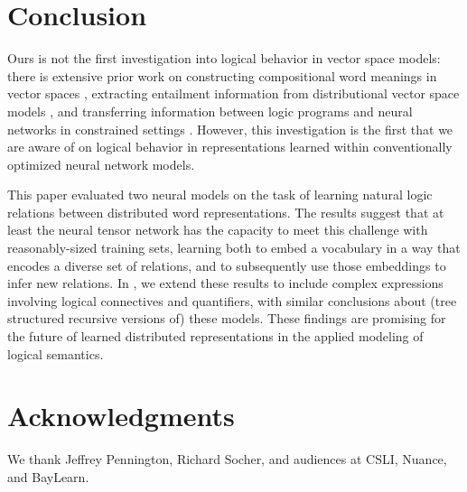 \documentclass[letterpaper]{article}
\begin{document}
\section{Conclusion}\label{sec:discussion}

Ours is not the first investigation into logical behavior in vector space models: 
 there is extensive prior work on constructing compositional word meanings in vector spaces \cite{ClarkCoeckeSadrzadeh2011,grefenstette2013towards,Hermann-etal:2013,rocktaschellow},
 extracting entailment information from distributional vector space models \cite{baroni2012entailment,rei2014looking},
 and transferring information between logic programs and neural networks in 
 constrained settings \cite{holldobler1999approximating,hitzler2004logic}. However, this investigation
  is the first that we are aware of on logical behavior in representations learned within conventionally
   optimized neural network models.

This paper evaluated two neural models on the task of learning 
natural logic relations between distributed word representations. The
results suggest that at least the neural tensor network
has the capacity to
meet this challenge with reasonably-sized training sets, learning both 
to embed a vocabulary in a way that encodes a diverse
set of relations, and to subsequently use those embeddings to infer new
relations. In
\cite{Bowman:Potts:Manning:2014}, we extend these results to include
complex expressions involving logical connectives and quantifiers, with similar
conclusions about (tree structured recursive versions of) these models. These findings
are promising for the future of learned distributed representations in the
applied modeling of logical semantics.

\section{Acknowledgments}

We thank Jeffrey Pennington, Richard Socher, and audiences at CSLI, Nuance, and BayLearn.


 
 
\end{document}
